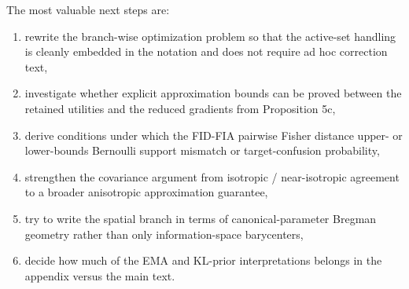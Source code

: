 The most valuable next steps are:
\begin{enumerate}
\item rewrite the branch-wise optimization problem so that the active-set handling is cleanly embedded in the notation and does not require ad hoc correction text,
\item investigate whether explicit approximation bounds can be proved between the retained utilities and the reduced gradients from Proposition 5c,
\item derive conditions under which the FID-FIA pairwise Fisher distance upper- or lower-bounds Bernoulli support mismatch or target-confusion probability,
\item strengthen the covariance argument from isotropic / near-isotropic agreement to a broader anisotropic approximation guarantee,
\item try to write the spatial branch in terms of canonical-parameter Bregman geometry rather than only information-space barycenters,
\item decide how much of the EMA and KL-prior interpretations belongs in the appendix versus the main text.
\end{enumerate}
